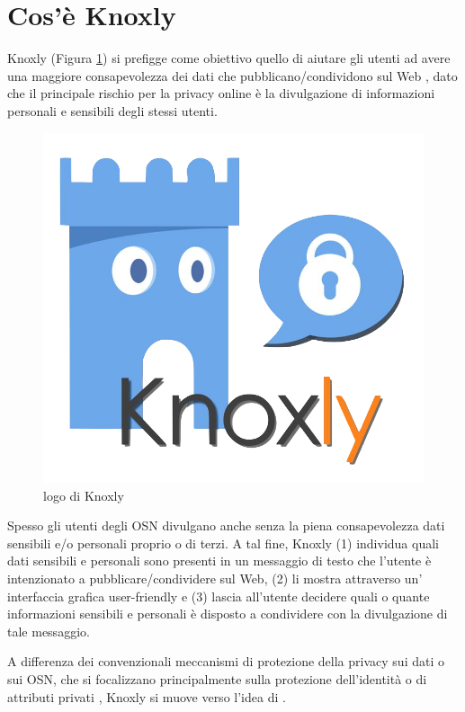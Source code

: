\section{Cos'è Knoxly}
Knoxly (Figura \ref{fig:logoKnoxly}) si prefigge come obiettivo quello di aiutare gli utenti ad avere una maggiore consapevolezza
dei dati che pubblicano/condividono sul Web , dato che il principale rischio per la privacy online è la divulgazione di
informazioni personali e sensibili degli stessi utenti.\newline
\begin{figure}[h]
    \centering
    \includegraphics[scale=0.25]{Figure/logoKnoxly.png}
    \caption{logo di Knoxly}
    \label{fig:logoKnoxly}
\end{figure}
\FloatBarrier
Spesso gli utenti degli OSN divulgano anche senza la piena consapevolezza dati sensibili e/o personali proprio o di terzi. A tal fine, Knoxly (1) individua quali dati sensibili e personali sono presenti in un messaggio di testo che l’utente è intenzionato a pubblicare/condividere sul Web, (2) li mostra attraverso un’ interfaccia grafica user-friendly e (3) lascia all’utente decidere quali o quante informazioni sensibili e personali è disposto a condividere con la divulgazione di tale messaggio.

A differenza dei convenzionali meccanismi di protezione della privacy sui dati o sui OSN, che si focalizzano principalmente sulla protezione dell’identità o di attributi privati \cite{collective-data, diff-privacy, urwho, inferr-privacy, protection-private, stalking}, Knoxly si muove verso l’idea di .

